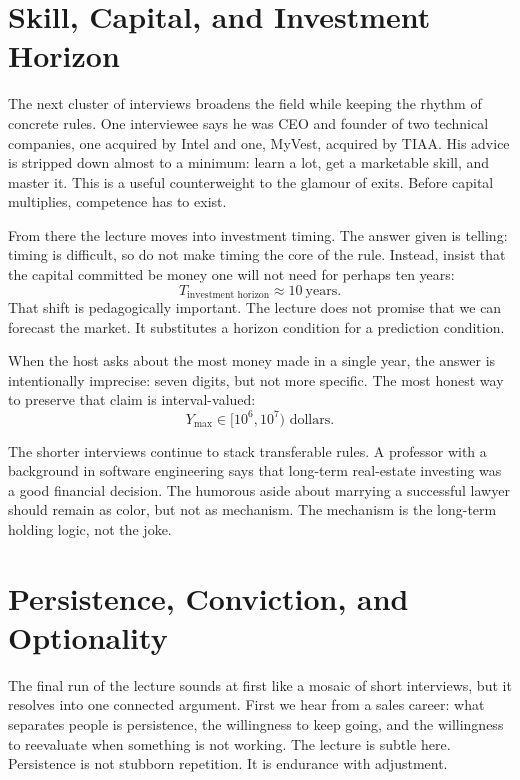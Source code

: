 \section{Skill, Capital, and Investment Horizon}

The next cluster of interviews broadens the field while keeping the rhythm of concrete rules. One interviewee says he was CEO and founder of two technical companies, one acquired by Intel and one, MyVest, acquired by TIAA. His advice is stripped down almost to a minimum: learn a lot, get a marketable skill, and master it. This is a useful counterweight to the glamour of exits. Before capital multiplies, competence has to exist.

From there the lecture moves into investment timing. The answer given is telling: timing is difficult, so do not make timing the core of the rule. Instead, insist that the capital committed be money one will not need for perhaps ten years:
\begin{equation}
T_{\text{investment horizon}} \approx 10\ \text{years}.
\end{equation}
That shift is pedagogically important. The lecture does not promise that we can forecast the market. It substitutes a horizon condition for a prediction condition.

When the host asks about the most money made in a single year, the answer is intentionally imprecise: seven digits, but not more specific. The most honest way to preserve that claim is interval-valued:
\begin{equation}
Y_{\max} \in [10^{6},10^{7}) \text{ dollars}.
\end{equation}

The shorter interviews continue to stack transferable rules. A professor with a background in software engineering says that long-term real-estate investing was a good financial decision. The humorous aside about marrying a successful lawyer should remain as color, but not as mechanism. The mechanism is the long-term holding logic, not the joke.

\section{Persistence, Conviction, and Optionality}

The final run of the lecture sounds at first like a mosaic of short interviews, but it resolves into one connected argument. First we hear from a sales career: what separates people is persistence, the willingness to keep going, and the willingness to reevaluate when something is not working. The lecture is subtle here. Persistence is not stubborn repetition. It is endurance with adjustment.

